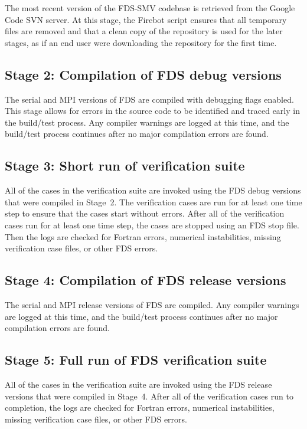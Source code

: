 \documentclass[11pt]{book}
\begin{document}
The most recent version of the FDS-SMV codebase is retrieved from the Google Code SVN server. At this stage, the Firebot script ensures that all temporary files are removed and that a clean copy of the repository is used for the later stages, as if an end user were downloading the repository for the first time.

\subsection*{Stage 2: Compilation of FDS debug versions}

The serial and MPI versions of FDS are compiled with debugging flags enabled. This stage allows for errors in the source code to be identified and traced early in the build/test process. Any compiler warnings are logged at this time, and the build/test process continues after no major compilation errors are found.

\subsection*{Stage 3: Short run of verification suite}

All of the cases in the verification suite are invoked using the FDS debug versions that were compiled in Stage~2. The verification cases are run for at least one time step to ensure that the cases start without errors. After all of the verification cases run for at least one time step, the cases are stopped using an FDS stop file. Then the logs are checked for Fortran errors, numerical instabilities, missing verification case files, or other FDS errors.

\subsection*{Stage 4: Compilation of FDS release versions}

The serial and MPI release versions of FDS are compiled. Any compiler warnings are logged at this time, and the build/test process continues after no major compilation errors are found.

\subsection*{Stage 5: Full run of FDS verification suite}

All of the cases in the verification suite are invoked using the FDS release versions that were compiled in Stage~4. After all of the verification cases run to completion, the logs are checked for Fortran errors, numerical instabilities, missing verification case files, or other FDS errors.
\end{document}
